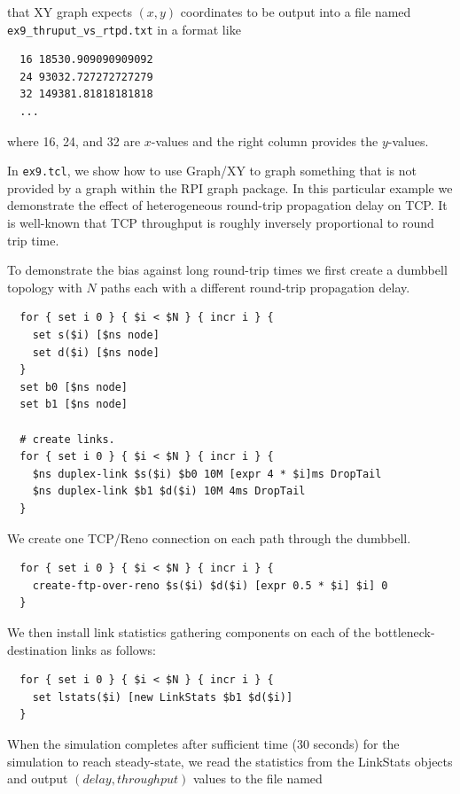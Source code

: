 \documentclass[11pt]{article}
\begin{document}
\noindent that XY graph expects $(x,y)$ coordinates to be output
into a file named \verb|ex9_thruput_vs_rtpd.txt| in a format like

\begin{verbatim}
  16 18530.909090909092
  24 93032.727272727279
  32 149381.81818181818
  ...
\end{verbatim}

\noindent where 16, 24, and 32 are $x$-values and the right column
provides the $y$-values.

In \verb|ex9.tcl|, we show how to use Graph/XY to graph something
that is not provided by a graph within the RPI graph package.  In
this particular example we demonstrate the effect of heterogeneous
round-trip propagation delay on TCP.  It is well-known that 
TCP throughput is roughly inversely proportional to round trip time.

To demonstrate the bias against long round-trip times we first
create a dumbbell topology with $N$ paths each with a different round-trip
propagation delay.

\begin{verbatim}
  for { set i 0 } { $i < $N } { incr i } {
    set s($i) [$ns node]
    set d($i) [$ns node]
  }
  set b0 [$ns node]
  set b1 [$ns node]
  
  # create links.
  for { set i 0 } { $i < $N } { incr i } {
    $ns duplex-link $s($i) $b0 10M [expr 4 * $i]ms DropTail
    $ns duplex-link $b1 $d($i) 10M 4ms DropTail
  }
\end{verbatim}

We create one TCP/Reno connection on each path through the 
dumbbell.

\begin{verbatim}
  for { set i 0 } { $i < $N } { incr i } {
    create-ftp-over-reno $s($i) $d($i) [expr 0.5 * $i] $i] 0
  }
\end{verbatim}
  

We then install link statistics gathering components on each 
of the bottleneck-destination links as follows:

\begin{verbatim}
  for { set i 0 } { $i < $N } { incr i } {
    set lstats($i) [new LinkStats $b1 $d($i)]
  }
\end{verbatim}

When the simulation completes after sufficient time (30 seconds) for the 
simulation to reach steady-state, we read the statistics from the LinkStats
objects and output $(delay,throughput)$ values to the file named 
\end{document}
